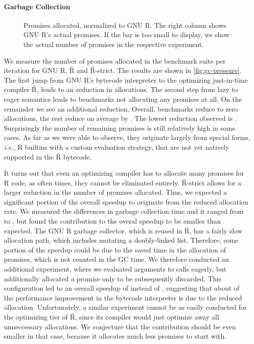 \documentclass[review,nonacm,screen,acmsmall,anonymous=true]{acmart}
\renewcommand{\Rsh}{{\sf\v R}\xspace}
\newcommand{\Rshstrict}{{\sf\v R-strict}\xspace}
\newcommand{\ie}{\emph{i.e.},\xspace}
\begin{document}
\paragraph{Garbage Collection}

\begin{figure}[h]
  \centering
  
  \caption{Promises allocated, normalized to GNU R. The right column shows GNU R's actual promises. If the bar is too small to display, we show the actual number of promises in the respective experiment.}
  \label{fig:gc-pressure}
\end{figure}

We measure the number of promises allocated in the
benchmark suite per iteration for GNU R, \Rsh and \Rsh-strict. The results are shown in
\autoref{fig:gc-pressure}. The first jump from GNU R's bytecode interpreter to
the optimizing just-in-time compiler \Rsh, leads to an \promiseAlocationReductionGnurRsh
reduction in allocations. The second step
from lazy to eager semantics leads to \promiseAlocationReductionRshStrictToZero
benchmarks not allocating any promises at all. On the remainder we see an additional
\promiseAlocationReductionRshStrict reduction.
Overall, \promiseAlocationReductionRshStrictToZero benchmarks reduce to zero
allocations, the rest reduce on average by \promiseAlocationReductionGnurRshStrict.
The lowest reduction observed is
\promiseAlocationReductionGnurRshStrictMin.
Surprisingly the number of remaining promises is
still relatively high in some cases. As far as we were able to observe, they
originate largely from special forms, \ie R builtins with a custom evaluation
strategy, that are not yet natively supported in the \Rsh bytecode.

It turns out that even an optimizing compiler has to allocate many promises for R
code, as often times, they cannot be eliminated entirely. \Rshstrict allows for
a larger reduction in the number of promises allocated.
Thus, we expected a significant portion of the overall speedup to originate from
the reduced allocation rate. We measured the differences in garbage collection
time and it ranged from \speedupGCRshStrictMin to \speedupGCRshStrictMax, but
found the contribution to the overal speedup to be smaller than expected.
The GNU R garbage collector, which is reused in \Rsh, has a fairly slow allocation path, which
includes mutating a doubly-linked list. Therefore, some portion of the speedup
could be due to the saved time in the allocation of promises, which is not counted in the GC time.
We therefore conducted an additional experiment, where we evaluated arguments to
calls eagerly, but additionally allocated a promise only to be subsequently discarded.
This configuration led to an overall speedup of
\speedupBCRshStrictAlloc instead of \speedupBCRshStrict, suggesting that
about \speedupDueToReducedGC of the performance improvement in the bytecode interpreter is due to the
reduced allocation. Unfortunately, a similar experiment cannot be as easily conducted
for the optimizing tier of \Rsh, since its compiler would just optimize away all
unneccessary allocations. We conjecture that the contribution should be even
smaller in that case, because it allocates much less promises to start with.
\end{document}
